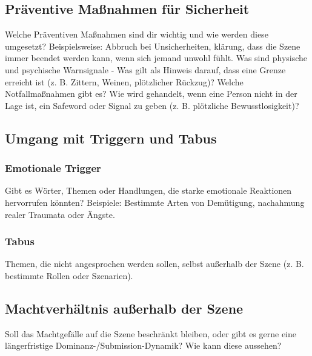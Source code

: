 \documentclass[a4paper,12pt]{article}
\begin{document}
\newpage
\subsection{Präventive Maßnahmen für Sicherheit}
\noindent Welche Präventiven Maßnahmen sind dir wichtig und wie werden diese umgesetzt? Beispielsweise: Abbruch bei Unsicherheiten, klärung, dass die Szene immer beendet werden kann, wenn sich jemand unwohl fühlt. Was sind physische und psychische Warnsignale - Was gilt als Hinweis darauf, dass eine Grenze erreicht ist (z. B. Zittern, Weinen, plötzlicher Rückzug)? Welche Notfallmaßnahmen gibt es? Wie wird gehandelt, wenn eine Person nicht in der Lage ist, ein Safeword oder Signal zu geben (z. B. plötzliche Bewusstlosigkeit)? \newline
\noindent \TextField[name=KommPreventSecure,multiline=true,height=40em, width=37em]{}

\newpage
\subsection{Umgang mit Triggern und Tabus}
\subsubsection{Emotionale Trigger}
\noindent
Gibt es Wörter, Themen oder Handlungen, die starke emotionale Reaktionen hervorrufen könnten? Beispiele: Bestimmte Arten von Demütigung, nachahmung realer Traumata oder Ängste.\newline
\noindent \TextField[name=TriggerEmotional,multiline=true,height=15em, width=37em]{}

\subsubsection{Tabus}
\noindent Themen, die nicht angesprochen werden sollen, selbst außerhalb der Szene (z. B. bestimmte Rollen oder Szenarien).\newline
\noindent \TextField[name=TriggerTabus,multiline=true,height=15em, width=37em]{}

\subsection{Machtverhältnis außerhalb der Szene}
\noindent Soll das Machtgefälle auf die Szene beschränkt bleiben, oder gibt es gerne eine längerfristige Dominanz-/Submission-Dynamik? Wie kann diese aussehen?\newline
\noindent \TextField[name=OutOfScene,multiline=true,height=8em, width=37em]{}
\end{document}
